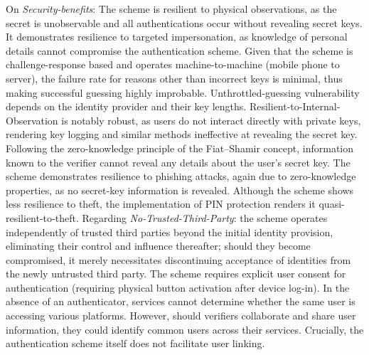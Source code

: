 On \textit{Security-benefits}: The scheme is resilient to physical observations, as the secret is unobservable and all authentications occur without revealing secret keys. It demonstrates resilience to targeted impersonation, as knowledge of personal details cannot compromise the authentication scheme. Given that the scheme is challenge-response based and operates machine-to-machine (mobile phone to server), the failure rate for reasons other than incorrect keys is minimal, thus making successful guessing highly improbable. Unthrottled-guessing vulnerability depends on the identity provider and their key lengths. Resilient-to-Internal-Observation is notably robust, as users do not interact directly with private keys, rendering key logging and similar methods ineffective at revealing the secret key. Following the zero-knowledge principle of the Fiat--Shamir concept, information known to the verifier cannot reveal any details about the user's secret key. The scheme demonstrates resilience to phishing attacks, again due to zero-knowledge properties, as no secret-key information is revealed. Although the scheme shows less resilience to theft, the implementation of PIN protection renders it quasi-resilient-to-theft. Regarding \textit{No-Trusted-Third-Party}: the scheme operates independently of trusted third parties beyond the initial identity provision, eliminating their control and influence thereafter; should they become compromised, it merely necessitates discontinuing acceptance of identities from the newly untrusted third party. The scheme requires explicit user consent for authentication (requiring physical button activation after device log-in). In the absence of an authenticator, services cannot determine whether the same user is accessing various platforms. However, should verifiers collaborate and share user information, they could identify common users across their services. Crucially, the authentication scheme itself does not facilitate user linking.